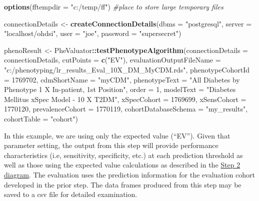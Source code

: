 \documentclass[]{article}
\newenvironment{Shaded}{\begin{snugshade}}{\end{snugshade}}
\newcommand{\CommentTok}[1]{\textcolor[rgb]{0.56,0.35,0.01}{\textit{#1}}}
\newcommand{\DataTypeTok}[1]{\textcolor[rgb]{0.13,0.29,0.53}{#1}}
\newcommand{\DecValTok}[1]{\textcolor[rgb]{0.00,0.00,0.81}{#1}}
\newcommand{\KeywordTok}[1]{\textcolor[rgb]{0.13,0.29,0.53}{\textbf{#1}}}
\newcommand{\NormalTok}[1]{#1}
\newcommand{\OperatorTok}[1]{\textcolor[rgb]{0.81,0.36,0.00}{\textbf{#1}}}
\newcommand{\StringTok}[1]{\textcolor[rgb]{0.31,0.60,0.02}{#1}}
\begin{document}
\begin{Shaded}
\begin{Highlighting}[]
\KeywordTok{options}\NormalTok{(}\DataTypeTok{fftempdir =} \StringTok{"c:/temp/ff"}\NormalTok{) }\CommentTok{#place to store large temporary files}

\NormalTok{connectionDetails <-}\StringTok{ }\KeywordTok{createConnectionDetails}\NormalTok{(}\DataTypeTok{dbms =} \StringTok{"postgresql"}\NormalTok{,}
                                              \DataTypeTok{server =} \StringTok{"localhost/ohdsi"}\NormalTok{,}
                                              \DataTypeTok{user =} \StringTok{"joe"}\NormalTok{,}
                                              \DataTypeTok{password =} \StringTok{"supersecret"}\NormalTok{)}

\NormalTok{phenoResult <-}\StringTok{ }\NormalTok{PheValuator}\OperatorTok{::}\KeywordTok{testPhenotypeAlgorithm}\NormalTok{(}\DataTypeTok{connectionDetails =}\NormalTok{ connectionDetails,}
               \DataTypeTok{cutPoints =} \KeywordTok{c}\NormalTok{(}\StringTok{"EV"}\NormalTok{),}
               \DataTypeTok{evaluationOutputFileName =} \StringTok{"c:/phenotyping/lr_results_Eval_10X_DM_MyCDM.rds"}\NormalTok{,}
               \DataTypeTok{phenotypeCohortId =} \DecValTok{1769702}\NormalTok{,}
               \DataTypeTok{cdmShortName =} \StringTok{"myCDM"}\NormalTok{,}
               \DataTypeTok{phenotypeText =} \StringTok{"All Diabetes by Phenotype 1 X In-patient, 1st Position"}\NormalTok{,}
               \DataTypeTok{order =} \DecValTok{1}\NormalTok{,}
               \DataTypeTok{modelText =} \StringTok{"Diabetes Mellitus xSpec Model - 10 X T2DM"}\NormalTok{,}
               \DataTypeTok{xSpecCohort =} \DecValTok{1769699}\NormalTok{,}
               \DataTypeTok{xSensCohort =} \DecValTok{1770120}\NormalTok{,}
               \DataTypeTok{prevalenceCohort =} \DecValTok{1770119}\NormalTok{,}
               \DataTypeTok{cohortDatabaseSchema =} \StringTok{"my_results"}\NormalTok{,}
               \DataTypeTok{cohortTable =} \StringTok{"cohort"}\NormalTok{)}
\end{Highlighting}
\end{Shaded}

In this example, we are using only the expected value (``EV''). Given
that parameter setting, the output from this step will provide
performance characteristics (i.e, sensitivity, specificity, etc.) at
each prediction threshold as well as those using the expected value
calculations as described in the \href{vignettes/Figure2.png}{Step 2
diagram}. The evaluation uses the prediction information for the
evaluation cohort developed in the prior step. The data frames produced
from this step may be saved to a csv file for detailed examination.
\end{document}

